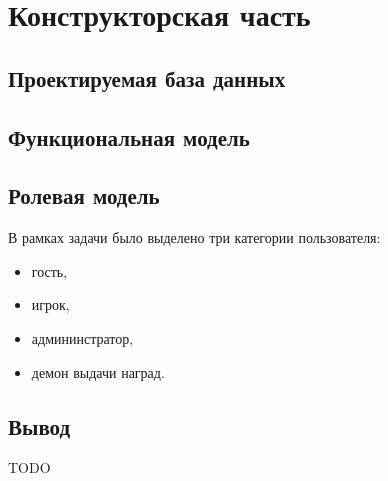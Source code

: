 \chapter{Конструкторская часть}


\section{Проектируемая база данных}



\section{Функциональная модель}



\section{Ролевая модель}

В рамках задачи было выделено три категории пользователя:
\begin{itemize}
	\item гость,
	\item игрок,
	\item админинстратор,
	\item демон выдачи наград.
\end{itemize}

\section*{Вывод}

TODO
\clearpage
